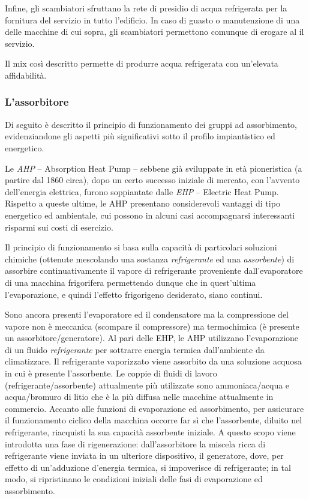 Infine, gli scambiatori sfruttano la rete di presidio di acqua refrigerata per la fornitura del servizio in tutto l'edificio. In caso di guasto o manutenzione di una delle macchine di cui sopra, gli scambiatori permettono comunque di erogare al  il servizio.

Il mix così descritto permette di produrre acqua refrigerata con un'elevata affidabilità.
\subsubsection{L'assorbitore}
Di seguito è descritto il principio di funzionamento dei gruppi ad assorbimento, evidenziandone gli aspetti più significativi sotto il profilo impiantistico ed energetico. 

Le \emph{AHP} -- Absorption Heat Pump -- sebbene già sviluppate in età pioneristica (a partire dal 1860 circa), dopo un certo successo iniziale di mercato, con l'avvento dell'energia elettrica, furono soppiantate dalle \emph{EHP} -- Electric Heat Pump. Rispetto a queste ultime, le AHP presentano considerevoli vantaggi di tipo energetico ed ambientale, cui possono in alcuni casi accompagnarsi interessanti risparmi sui costi di esercizio.

Il principio di funzionamento si basa sulla capacità di particolari soluzioni chimiche (ottenute mescolando una sostanza \emph{refrigerante} ed una \emph{assorbente}) di assorbire continuativamente il vapore di refrigerante proveniente dall'evaporatore di una macchina frigorifera permettendo dunque che in quest'ultima l'evaporazione, e quindi l'effetto frigorigeno desiderato, siano continui.

Sono ancora presenti l'evaporatore ed il condensatore ma la compressione del vapore non è meccanica (scompare il compressore) ma termochimica (è presente un assorbitore/generatore). Al pari delle EHP, le AHP utilizzano l'evaporazione di un fluido \emph{refrigerante} per sottrarre energia termica dall'ambiente da climatizzare. Il refrigerante vaporizzato viene assorbito da una soluzione acquosa in cui è presente l'assorbente. Le coppie di fluidi di lavoro (refrigerante/assorbente) attualmente più utilizzate sono ammoniaca/acqua e acqua/bromuro di litio che è la più diffusa nelle macchine attualmente in commercio. Accanto alle funzioni di evaporazione ed assorbimento, per assicurare il funzionamento ciclico della macchina occorre far sì che l'assorbente, diluito nel refrigerante, riacquisti la sua capacità assorbente iniziale. A questo scopo viene introdotta una fase di rigenerazione: dall'assorbitore la miscela ricca di refrigerante viene inviata in un ulteriore dispositivo, il generatore, dove, per effetto di un'adduzione d'energia termica, si impoverisce di refrigerante; in tal modo, si ripristinano le condizioni iniziali delle fasi di evaporazione ed assorbimento.


